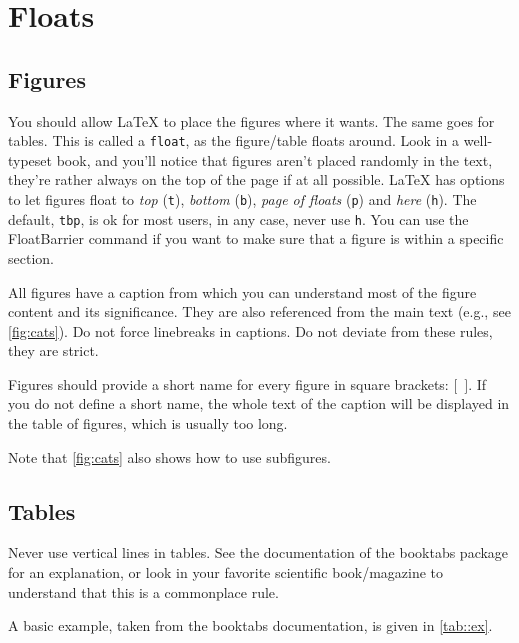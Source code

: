 \documentclass[../{{cookiecutter.project_slug}}.tex]{subfiles}
\begin{document}
    \section{Floats}
    \subsection{Figures}
    You should  allow \LaTeX{} to place  the figures where it  wants.  The 
    same  goes  for  tables.   This  is  called  a  \verb+float+,  as  the 
    figure/table floats around.   Look in a well-typeset  book, and you'll 
    notice that figures aren't placed randomly in the text, they're rather 
    always  on the  top  of  the page  if  at  all possible. \LaTeX{}  has 
    options to  let figures float to  \emph{top} (\verb+t+), \emph{bottom} 
    (\verb+b+),   \emph{page  of   floats}   (\verb+p+)  and   \emph{here} 
    (\verb+h+).  The  default, \verb+tbp+, is  ok for most users,  in any 
    case, never use \verb+h+.  You can use the FloatBarrier command if you 
    want to make sure that a figure is within a specific section.          

    All figures have  a caption from which you can  understand most of the 
    figure content  and its significance.   They are also  referenced from 
    the main text (e.g., see \cref{fig:cats}).  Do not force linebreaks in 
    captions.  Do not deviate from these rules, they are strict.           

    Figures  should  provide a  short  name  for  every figure  in  square 
    brackets: $[$~$]$. If  you do not define a short  name, the whole text 
    of the caption will be displayed in the table of figures, which is 
    usually too long.
    
    Note that \cref{fig:cats} also shows how to use subfigures.



    \subsection{Tables}
    Never  use vertical  lines in  tables.  See  the documentation  of the 
    booktabs  package  for  an  explanation,  or  look  in  your  favorite 
    scientific  book/magazine to  understand  that this  is a  commonplace 
    rule.                                                                  

    A basic  example, taken  from the booktabs  documentation, is  given in
    \cref{tab::ex}.
\end{document}
